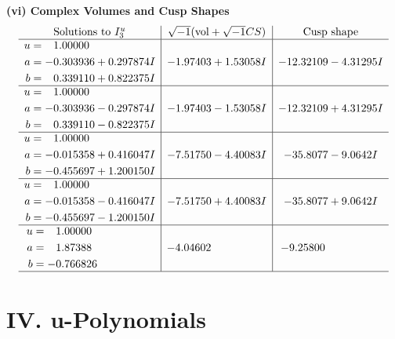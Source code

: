 \documentclass[1p]{elsarticle_modified}
\theoremstyle{definition}
\newcommand{\I}{\sqrt{-1}}
\begin{document}
\newpage\flushleft \textbf{(vi) Complex Volumes and Cusp Shapes}
$$\begin{array}{c|c|c}  
\text{Solutions to }I^u_{3}& \I (\text{vol} + \sqrt{-1}CS) & \text{Cusp shape}\\
 \hline 
\begin{aligned}
u &= \phantom{-}1.00000\phantom{ +0.000000I} \\
a &= -0.303936 + 0.297874 I \\
b &= \phantom{-}0.339110 + 0.822375 I\end{aligned}
 & -1.97403 + 1.53058 I & -12.32109 - 4.31295 I \\ \hline\begin{aligned}
u &= \phantom{-}1.00000\phantom{ +0.000000I} \\
a &= -0.303936 - 0.297874 I \\
b &= \phantom{-}0.339110 - 0.822375 I\end{aligned}
 & -1.97403 - 1.53058 I & -12.32109 + 4.31295 I \\ \hline\begin{aligned}
u &= \phantom{-}1.00000\phantom{ +0.000000I} \\
a &= -0.015358 + 0.416047 I \\
b &= -0.455697 + 1.200150 I\end{aligned}
 & -7.51750 - 4.40083 I & -35.8077 - 9.0642 I \\ \hline\begin{aligned}
u &= \phantom{-}1.00000\phantom{ +0.000000I} \\
a &= -0.015358 - 0.416047 I \\
b &= -0.455697 - 1.200150 I\end{aligned}
 & -7.51750 + 4.40083 I & -35.8077 + 9.0642 I \\ \hline\begin{aligned}
u &= \phantom{-}1.00000\phantom{ +0.000000I} \\
a &= \phantom{-}1.87388\phantom{ +0.000000I} \\
b &= -0.766826\phantom{ +0.000000I}\end{aligned}
 & -4.04602\phantom{ +0.000000I} & -9.25800\phantom{ +0.000000I}\\
 \hline 
 \end{array}$$\newpage
\newpage\renewcommand{\arraystretch}{1}
\centering \section*{ IV. u-Polynomials}
\end{document}
